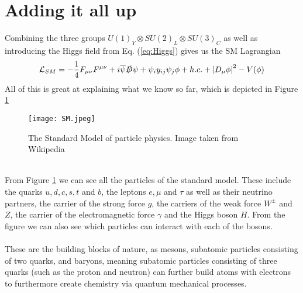 \documentclass[12pt, a4paper]{book}
\begin{document}
\section{Adding it all up}
Combining the three groups $U(1)_Y\otimes SU(2)_L\otimes SU(3)_C$ as well as introducing the Higgs field from Eq. (\ref{eq:Higgs}) gives us the SM Lagrangian
$$
    \mathcal{L}_{SM} = -\frac{1}{4}F_{\mu\nu}F^{\mu\nu} + i\overline{\psi}\slashed{D}\psi + \psi_iy_{ij}\psi_j\phi + h.c. + \abs{D_\mu\phi}^2 - V(\phi)
$$
All of this is great at explaining what we know so far, which is depicted in Figure \ref{fig:SM}
\begin{figure}[!ht]
    \centering
    \texttt{[image: SM.jpeg]}
    \caption[The Standard Model]{The Standard Model of particle physics. Image taken from Wikipedia \cite{sm_wikipedia}}\label{fig:SM}
\end{figure}
\\From Figure \ref{fig:SM} we can see all the particles of the standard model. These include the quarks $u,d,c,s,t$ and $b$, the leptons $e,\mu$ and $\tau$ as well as their neutrino partners, the carrier of the strong force $g$, the carriers of the weak force $W^\pm$ and $Z$, 
the carrier of the electromagnetic force $\gamma$ and the Higgs boson $H$. From the figure we can also see which particles can interact with each of the bosons. \\
\\These are the building blocks of nature, as mesons, subatomic particles consisting of two quarks, and baryons, meaning subatomic particles consisting of three quarks (such as the proton and neutron) can further build atoms with electrons to furthermore create chemistry via 
quantum mechanical processes. 
\end{document}
